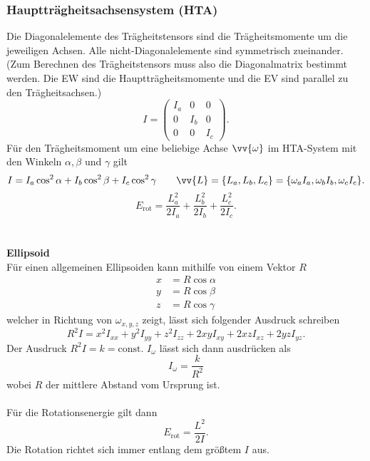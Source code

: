 \documentclass[a4paper,12pt]{article}
\begin{document}
\subsubsection{Hauptträgheitsachsensystem (HTA)}
Die Diagonalelemente des Trägheitstensors sind die Trägheitsmomente um die jeweiligen Achsen. Alle nicht-Diagonalelemente sind symmetrisch zueinander. (Zum Berechnen des Trägheitstensors muss also die Diagonalmatrix bestimmt werden. Die EW sind die Hauptträgheitsmomente und die EV sind parallel zu den Trägheitsachsen.)
\[ 
        I=\left(\begin{matrix} %
                        I_a&0&0\\
                        0&I_b&0\\
                        0&0&I_c
        \end{matrix}\right)
.\] 
Für den Trägheitsmoment um eine beliebige Achse $\vv{\omega }$ im HTA-System mit den Winkeln $\alpha ,\beta $ und $\gamma $ gilt
\[ 
        I=I_a\cos ^2\alpha +I_b \cos ^2\beta +I_c\cos ^2\gamma \qquad \vv{L}=\{L_a,L_b,L_c\}=\{\omega _aI_a,\omega _bI_b,\omega _cI_c\}
.\] 
\[ 
        E_{\text{rot}}=\dfrac{L_a^2}{2I_a}+\dfrac{L_b^2}{2I_b}+\dfrac{L_c^2}{2I_c}
.\] 
\\\hfill\\\textbf{Ellipsoid}\\ 
Für einen allgemeinen Ellipsoiden kann mithilfe von einem Vektor $R$ 
\begin{align*} %
        x&=R\cos \alpha \\
        y&=R\cos \beta \\
        z&=R\cos \gamma 
\end{align*}
welcher in Richtung von $\omega _{x,y,z}$ zeigt, lässt sich folgender Ausdruck schreiben
\[ 
        R^2I=x^2I_{xx}+y^2I_{yy}+z^2I_{zz}+2xyI_{xy}+2xzI_{xz}+2yzI_{yz}
.\] 
Der Ausdruck $R^2I=k=\text{const}$. $I_\omega $ lässt sich dann ausdrücken als
\[ 
        I_\omega =\dfrac{k}{R^2}
\] 
wobei $R$ der mittlere Abstand vom Ursprung ist.\\\\
Für die Rotationsenergie gilt dann
\[ 
        E_{\text{rot}}=\dfrac{L^2}{2I}
.\] 
Die Rotation richtet sich immer entlang dem größtem $I$ aus.
\end{document}
